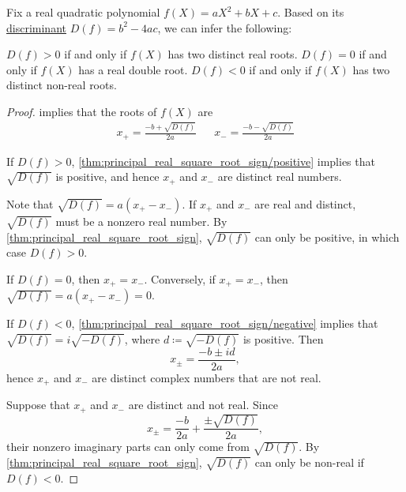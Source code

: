 \begin{corollary}\label{thm:real_quadratic_discriminant}
  Fix a real quadratic polynomial \( f(X) = a X^2 + b X + c \). Based on its \hyperref[def:discriminant]{discriminant} \( D(f) = b^2 - 4ac \), we can infer the following:
  \begin{thmenum}
     \( D(f) > 0 \) if and only if \( f(X) \) has two distinct real roots.
     \( D(f) = 0 \) if and only if \( f(X) \) has a real double root.
     \( D(f) < 0 \) if and only if \( f(X) \) has two distinct non-real roots.
  \end{thmenum}
\end{corollary}
\begin{proof}
   implies that the roots of \( f(X) \) are
  \begin{align*}
    x_+ = \frac {-b + \sqrt{D(f)}} {2a}
    &&
    x_- = \frac {-b - \sqrt{D(f)}} {2a}
  \end{align*}

  \SufficiencySubProof* If \( D(f) > 0 \), \cref{thm:principal_real_square_root_sign/positive} implies that \( \sqrt{D(f)} \) is positive, and hence \( x_+ \) and \( x_- \) are distinct real numbers.

  \NecessitySubProof* Note that \( \sqrt{D(f)} = a (x_+ - x_-) \). If \( x_+ \) and \( x_- \) are real and distinct, \( \sqrt{D(f)} \) must be a nonzero real number. By \cref{thm:principal_real_square_root_sign}, \( \sqrt{D(f)} \) can only be positive, in which case \( D(f) > 0 \).

  \SufficiencySubProof* If \( D(f) = 0 \), then \( x_+ = x_- \).
  \NecessitySubProof* Conversely, if \( x_+ = x_- \), then \( \sqrt{D(f)} = a(x_+ - x_-) = 0 \).

  \SufficiencySubProof* If \( D(f) < 0 \), \cref{thm:principal_real_square_root_sign/negative} implies that \( \sqrt{D(f)} = i \sqrt{-D(f)} \), where \( d \coloneqq \sqrt{-D(f)} \) is positive. Then
  \begin{equation*}
    x_\pm = \frac {-b \pm i d} {2a},
  \end{equation*}
  hence \( x_+ \) and \( x_- \) are distinct complex numbers that are not real.

  \NecessitySubProof Suppose that \( x_+ \) and \( x_- \) are distinct and not real. Since
  \begin{equation*}
    x_\pm = \frac {-b} {2a} + \frac {\pm \sqrt{D(f)}} {2a},
  \end{equation*}
  their nonzero imaginary parts can only come from \( \sqrt{D(f)} \). By \cref{thm:principal_real_square_root_sign}, \( \sqrt{D(f)} \) can only be non-real if \( D(f) < 0 \).
\end{proof}


